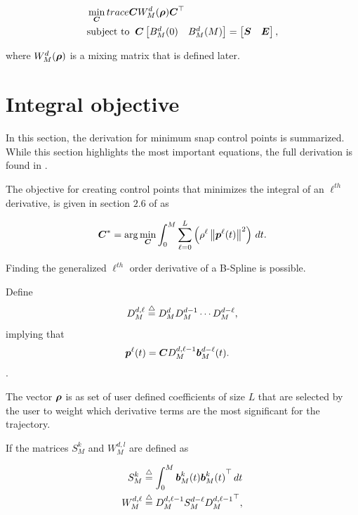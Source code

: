  \begin{equation}
 	\label{eq:min_integral_of_norm}
 	\begin{aligned}
 	&\min_{\boldsymbol{C}} trace {\boldsymbol{C} W_M^{d}(\boldsymbol{\rho}) \boldsymbol{C}^\top} \\
 	&\text{subject to } \: \boldsymbol{C} \begin{bmatrix} B_M^d(0) & B_M^d(M) \end{bmatrix} = \begin{bmatrix} \boldsymbol{S} & \boldsymbol{E} \end{bmatrix},
 	\end{aligned}
 \end{equation}

where $W_M^{d}(\boldsymbol{\rho})$ is a mixing matrix that is defined later.

\section{Integral objective}

In this section, the derivation for minimum snap control points is summarized.
While this section highlights the most important equations, the full derivation is found in \cite{beard2025BSplines}.

The objective for creating control points that minimizes the integral of an $\ell^{th}$ derivative, is given in section $2.6$ of \cite{beard2025BSplines} as

\begin{equation}
    \label{eq:integral_constraint}
    \boldsymbol{C}^\ast = \arg\min_{\boldsymbol{C}} \int_0^M \sum_{\ell=0}^L \left( \rho^\ell \left\|\boldsymbol{p}^{\ell}(t)\right\|^2\right) \, dt.
\end{equation}

Finding the generalized $\ell^{th}$ order derivative of a B-Spline is possible.

Define
 \[
 D_M^{d,\ell} \stackrel{\triangle}{=} D_M^d D_M^{d-1}\cdots D_M^{d-\ell},
 \]
 implying that 
 \begin{align*}
 	\boldsymbol{p}^{\ell}(t) &= \boldsymbol{C} D_M^{d,\ell-1} 	\boldsymbol{b}_M^{d-\ell}(t).
 \end{align*}.

The vector $\boldsymbol{\rho}$ is as set of user defined coefficients of size $L$ that are selected by the user to weight which derivative terms are the most significant for the trajectory.

If the matrices $S_M^k$ and $W_M^{d,l}$ are defined as

\begin{align*}
    S_M^k &\stackrel{\triangle}{=} \int_0^M 	\boldsymbol{b}_M^{k}(t) {\boldsymbol{b}_M^{k}(t)}^\top \, dt \\
    W_M^{d,\ell} &\stackrel{\triangle}{=} D_M^{d,\ell-1} S_M^{d-\ell} {D_M^{d,\ell-1}}^\top,
\end{align*}

